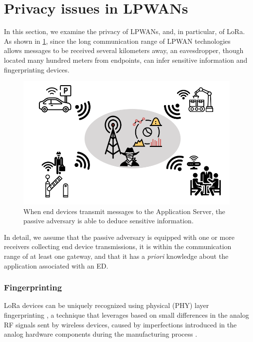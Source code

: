 \section{Privacy issues in LPWANs}
In this section, we examine the privacy of LPWANs, and, in particular, of LoRa. As shown in \ref{fig:passive}, since the long communication range of LPWAN technologies allows messages to be received several kilometers away, an eavesdropper, though located many hundred meters from endpoints, can infer sensitive information and fingerprinting devices.
\begin{figure}[ht]
    \centering
    \includegraphics[width=0.7\linewidth]{images/threat/passive_adversary.png}
    \caption{When end devices transmit messages to the Application Server, the passive adversary is able to deduce sensitive information.}
    \label{fig:passive}
\end{figure}
In detail, we assume that the passive adversary is equipped with one or more receivers collecting end device transmissions, it is within the communication range of at least one gateway, and that it has a \textit{priori} knowledge about the application associated with an ED.

\subsubsection{Fingerprinting}
LoRa devices can be uniquely recognized using physical (PHY) layer fingerprinting \cite{inproceedings},  a technique that leverages based on small differences in the analog RF signals sent by wireless devices, caused by imperfections introduced in the analog hardware components during the manufacturing process \cite{10.1145/1409944.1409959}.

